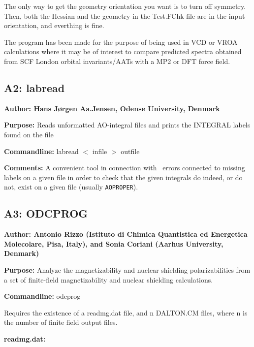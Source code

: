 The only way to get the geometry orientation you want is to turn
        off symmetry. 
        Then, both the Hessian and the geometry in the Test.FChk file are
        in the input orientation, and everthing is fine.

The program has been made for the purpose of being used in VCD or
VROA 
calculations where it may be of interest to compare predicted spectra
obtained from SCF London orbital invariants/AATs with a MP2 or DFT force field.

\subsection*{A2: labread}

\noindent
{\large\bf Author: \normalsize\large Hans J\o rgen Aa.Jensen,
Odense University, Denmark}

\smallskip

\noindent 
{\bf Purpose:} Reads unformatted AO-integral files and prints the
INTEGRAL labels found on the file

\smallskip
\noindent
{\bf Commandline:} labread $<$ infile $>$ outfile

\smallskip
\noindent
{\bf Comments:}  A convenient tool in connection with \siraba\ errors
connected to missing labels on a given file in order to check that the
given integrals do indeed, or do not, exist on a given file (usually
\verb|AOPROPER|). 

\subsection*{A3: ODCPROG}

\noindent
{\large\bf Author: \normalsize\large Antonio Rizzo (Istituto di
Chimica Quantistica ed Energetica Molecolare, Pisa, Italy), and
Sonia Coriani (Aarhus University, Denmark)}

\smallskip

\noindent 
{\bf Purpose:} Analyze the magnetizability and nuclear shielding
polarizabilities from a set of finite-field magnetizability and
nuclear shielding calculations.

\smallskip
\noindent
{\bf Commandline:} odcprog

Requires the existence of a readmg.dat file, and n DALTON.CM files,
where n is the number of finite field output files.

\smallskip
\noindent
{\bf readmg.dat:} 

